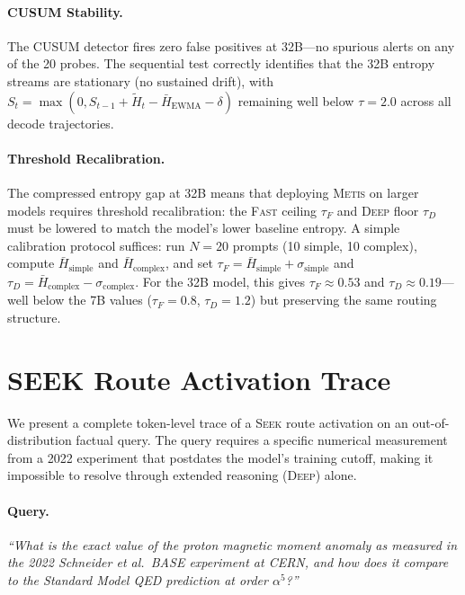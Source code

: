 \documentclass[11pt,a4paper]{article}
\newcommand{\metis}{\textsc{Metis}}
\begin{document}
\paragraph{CUSUM Stability.}
The CUSUM detector fires zero false positives at 32B---no spurious alerts on any of the 20 probes. The sequential test correctly identifies that the 32B entropy streams are stationary (no sustained drift), with $S_t = \max(0, S_{t-1} + \tilde{H}_t - \bar{H}_{\text{EWMA}} - \delta)$ remaining well below $\tau{=}2.0$ across all decode trajectories.

\paragraph{Threshold Recalibration.}
The compressed entropy gap at 32B means that deploying \metis{} on larger models requires threshold recalibration: the \textsc{Fast} ceiling $\tau_F$ and \textsc{Deep} floor $\tau_D$ must be lowered to match the model's lower baseline entropy. A simple calibration protocol suffices: run $N{=}20$ prompts (10 simple, 10 complex), compute $\bar{H}_{\text{simple}}$ and $\bar{H}_{\text{complex}}$, and set $\tau_F = \bar{H}_{\text{simple}} + \sigma_{\text{simple}}$ and $\tau_D = \bar{H}_{\text{complex}} - \sigma_{\text{complex}}$. For the 32B model, this gives $\tau_F \approx 0.53$ and $\tau_D \approx 0.19$---well below the 7B values ($\tau_F{=}0.8$, $\tau_D{=}1.2$) but preserving the same routing structure.

\section{SEEK Route Activation Trace}
\label{app:seek}

We present a complete token-level trace of a \textsc{Seek} route activation on an out-of-distribution factual query. The query requires a specific numerical measurement from a 2022 experiment that postdates the model's training cutoff, making it impossible to resolve through extended reasoning (\textsc{Deep}) alone.

\paragraph{Query.}
\emph{``What is the exact value of the proton magnetic moment anomaly as measured in the 2022 Schneider et al.\ BASE experiment at CERN, and how does it compare to the Standard Model QED prediction at order $\alpha^5$?''}
\end{document}
